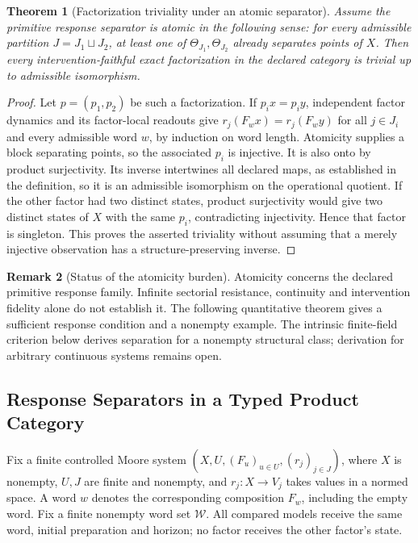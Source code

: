 \documentclass[11pt,a4paper]{article}
\newtheorem{theorem}{Theorem}[section]
\theoremstyle{definition}
\newtheorem{remark}[theorem]{Remark}
\begin{document}
\begin{theorem}[Factorization triviality under an atomic separator]
\label{thm:iint-faithful-factorization-triviality}
Assume the primitive response separator is atomic in the following sense:
for every admissible partition $J=J_1\sqcup J_2$, at least one of
$\Theta_{J_1},\Theta_{J_2}$ already separates points of $X$.
Then every intervention-faithful exact factorization in the declared category
is trivial up to admissible isomorphism.
\end{theorem}
\begin{proof}
Let $p=(p_1,p_2)$ be such a factorization. If $p_i x=p_i y$, independent
factor dynamics and its factor-local readouts give
$r_j(F_wx)=r_j(F_wy)$ for all $j\in J_i$ and every admissible word $w$,
by induction on word length. Atomicity supplies a block separating points,
so the associated $p_i$ is injective. It is also onto by product surjectivity.
Its inverse intertwines all declared maps, as established in the definition,
so it is an admissible isomorphism on the operational quotient. If the other
factor had two distinct states, product surjectivity would give two distinct
states of $X$ with the same $p_i$, contradicting injectivity. Hence that
factor is singleton. This proves the asserted triviality without assuming
that a merely injective observation has a structure-preserving inverse.
\end{proof}

\begin{remark}[Status of the atomicity burden]\label{rem:iint-atomicity-burden}
Atomicity concerns the declared primitive response family. Infinite sectorial
resistance, continuity and intervention fidelity alone do not establish it.
The following quantitative theorem gives a sufficient response condition
and a nonempty example. The intrinsic finite-field criterion below derives separation for a nonempty
structural class; derivation for arbitrary continuous systems remains open.
\end{remark}

\subsection{Response Separators in a Typed Product Category}

Fix a finite controlled Moore system $(X,U,(F_u)_{u\in U},(r_j)_{j\in J})$,
where $X$ is nonempty, $U,J$ are finite and nonempty, and
$r_j:X\to V_j$ takes values in a normed space. A word $w$ denotes the
corresponding composition $F_w$, including the empty word. Fix a finite
nonempty word set $\mathcal W$. All compared models receive the same word,
initial preparation and horizon; no factor receives the other factor's state.
\end{document}
